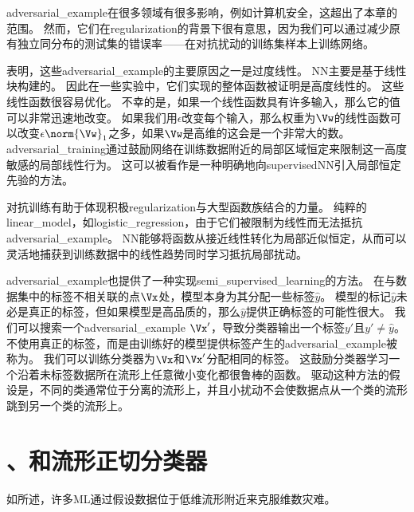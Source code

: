 
\gls{adversarial_example}在很多领域有很多影响，例如计算机安全，这超出了本章的范围。
然而，它们在\gls{regularization}的背景下很有意思，因为我们可以通过减少原有独立同分布的测试集的错误率——在对抗扰动的训练集样本上训练网络\citep{Szegedy-et-al-2014b,Goodfellow-et-al-2014b}。


\cite{Goodfellow-et-al-2014b}表明，这些\gls{adversarial_example}的主要原因之一是过度线性。
\gls{NN}主要是基于线性块构建的。
因此在一些实验中，它们实现的整体函数被证明是高度线性的。
这些线性函数很容易优化。
不幸的是，如果一个线性函数具有许多输入，那么它的值可以非常迅速地改变。
如果我们用$\epsilon$改变每个输入，那么权重为$\Vw$的线性函数可以改变$\epsilon \norm{\Vw}_1$之多，如果$\Vw$是高维的这会是一个非常大的数。
\gls{adversarial_training}通过鼓励网络在训练数据附近的局部区域恒定来限制这一高度敏感的局部线性行为。
这可以被看作是一种明确地向\gls{supervised}\gls{NN}引入局部恒定先验的方法。

对抗训练有助于体现积极\gls{regularization}与大型函数族结合的力量。
纯粹的\gls{linear_model}，如\gls{logistic_regression}，由于它们被限制为线性而无法抵抗\gls{adversarial_example}。
\gls{NN}能够将函数从接近线性转化为局部近似恒定，从而可以灵活地捕获到训练数据中的线性趋势同时学习抵抗局部扰动。

\gls{adversarial_example}也提供了一种实现\gls{semi_supervised_learning}的方法。
在与数据集中的标签不相关联的点$\Vx$处，模型本身为其分配一些标签$\hat y$。
模型的标记$\hat y$未必是真正的标签，但如果模型是高品质的，那么$\hat y$提供正确标签的可能性很大。
我们可以搜索一个\gls{adversarial_example} $\Vx'$，导致分类器输出一个标签$y'$且$y' \neq \hat y$。
不使用真正的标签，而是由训练好的模型提供标签产生的\gls{adversarial_example}被称为\citep{Miyato-et-al-2015}。
我们可以训练分类器为$\Vx$和$\Vx'$分配相同的标签。
这鼓励分类器学习一个沿着未标签数据所在流形上任意微小变化都很鲁棒的函数。
驱动这种方法的假设是，不同的类通常位于分离的流形上，并且小扰动不会使数据点从一个类的流形跳到另一个类的流形上。


\section{、和流形正切分类器}
\label{sec:tangent_distance_tangent_prop_and_manifold_tangent_classifier}
如所述，许多\gls{ML}通过假设数据位于低维流形附近来克服维数灾难。

